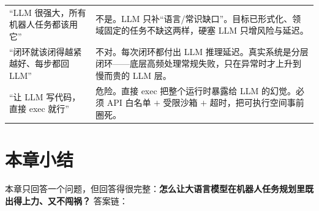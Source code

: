 \begin{table}[H]
\begin{tabular}{p{4.0cm}p{8.2cm}}
“LLM 很强大，所有机器人任务都该用它” & 不是。LLM 只补“语言/常识缺口”。目标已形式化、领域固定的任务不缺这两样，硬塞 LLM 只增风险与延迟。 \\
“闭环就该闭得越紧越好、每步都回 LLM” & 不对。每次闭环都付出 LLM 推理延迟。真实系统是分层闭环——底层高频处理常规失败，只在异常时才上升到慢而贵的 LLM 层。 \\
“让 LLM 写代码，直接 exec 就行” & 危险。直接 exec 把整个运行时暴露给 LLM 的幻觉。必须 API 白名单 $+$ 受限沙箱 $+$ 超时，把可执行空间事前圈死。 \\
\bottomrule
\end{tabular}
\end{table}

\section*{本章小结}
\label{sec:llm-summary}

本章只回答一个问题，但回答得很完整：\textbf{怎么让大语言模型在机器人任务规划里既出得上力、又不闯祸？} 答案链：


